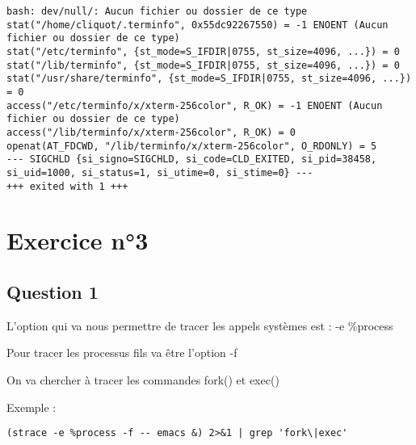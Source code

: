 \documentclass[11pt]{article}
\begin{document}
\begin{lstlisting}
bash: dev/null/: Aucun fichier ou dossier de ce type
stat("/home/cliquot/.terminfo", 0x55dc92267550) = -1 ENOENT (Aucun fichier ou dossier de ce type)
stat("/etc/terminfo", {st_mode=S_IFDIR|0755, st_size=4096, ...}) = 0
stat("/lib/terminfo", {st_mode=S_IFDIR|0755, st_size=4096, ...}) = 0
stat("/usr/share/terminfo", {st_mode=S_IFDIR|0755, st_size=4096, ...}) = 0
access("/etc/terminfo/x/xterm-256color", R_OK) = -1 ENOENT (Aucun fichier ou dossier de ce type)
access("/lib/terminfo/x/xterm-256color", R_OK) = 0
openat(AT_FDCWD, "/lib/terminfo/x/xterm-256color", O_RDONLY) = 5
--- SIGCHLD {si_signo=SIGCHLD, si_code=CLD_EXITED, si_pid=38458, si_uid=1000, si_status=1, si_utime=0, si_stime=0} ---
+++ exited with 1 +++

\end{lstlisting}

\section{Exercice n°3}
\label{sec:org9f778e8}

\subsection{Question 1}
\label{sec:org999a06c}

L'option qui va nous permettre de tracer les appels systèmes est : -e \%process

Pour tracer les processus fils va être l'option -f

On va chercher à tracer les commandes fork() et exec()

Exemple :

\begin{lstlisting}
(strace -e %process -f -- emacs &) 2>&1 | grep 'fork\|exec'
\end{lstlisting}
\end{document}
